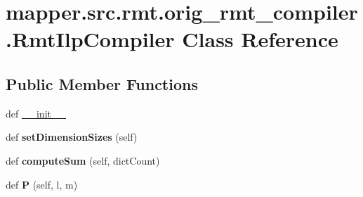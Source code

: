 \hypertarget{classmapper_1_1src_1_1rmt_1_1orig__rmt__compiler_1_1_rmt_ilp_compiler}{}\section{mapper.\+src.\+rmt.\+orig\+\_\+rmt\+\_\+compiler.\+Rmt\+Ilp\+Compiler Class Reference}
\label{classmapper_1_1src_1_1rmt_1_1orig__rmt__compiler_1_1_rmt_ilp_compiler}
\subsection*{Public Member Functions}
\begin{DoxyCompactItemize}
\item 
def \hyperlink{classmapper_1_1src_1_1rmt_1_1orig__rmt__compiler_1_1_rmt_ilp_compiler_af84883e69fc6fb64376308b9c0879ae1}{\+\_\+\+\_\+init\+\_\+\+\_\+}
\item 
\hypertarget{classmapper_1_1src_1_1rmt_1_1orig__rmt__compiler_1_1_rmt_ilp_compiler_a800d796d8d5f887987c5086f818497dc}{}def {\bfseries set\+Dimension\+Sizes} (self)\label{classmapper_1_1src_1_1rmt_1_1orig__rmt__compiler_1_1_rmt_ilp_compiler_a800d796d8d5f887987c5086f818497dc}

\item 
\hypertarget{classmapper_1_1src_1_1rmt_1_1orig__rmt__compiler_1_1_rmt_ilp_compiler_a36f6c5f3189278265ef055a0da66d20c}{}def {\bfseries compute\+Sum} (self, dict\+Count)\label{classmapper_1_1src_1_1rmt_1_1orig__rmt__compiler_1_1_rmt_ilp_compiler_a36f6c5f3189278265ef055a0da66d20c}

\item 
\hypertarget{classmapper_1_1src_1_1rmt_1_1orig__rmt__compiler_1_1_rmt_ilp_compiler_a8cda2c3c5bc07b5e83faf75f0b26071b}{}def {\bfseries P} (self, l, m)\label{classmapper_1_1src_1_1rmt_1_1orig__rmt__compiler_1_1_rmt_ilp_compiler_a8cda2c3c5bc07b5e83faf75f0b26071b}


\end{DoxyCompactItemize}
